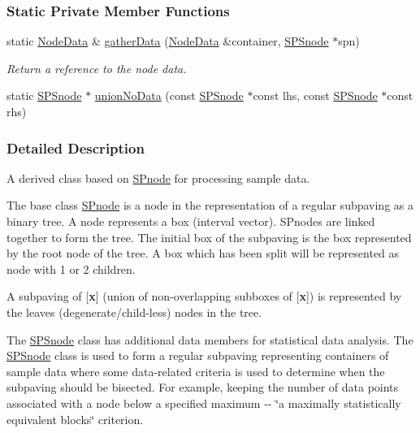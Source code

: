 \subsubsection*{\-Static \-Private \-Member \-Functions}
\begin{DoxyCompactItemize}
\item 
static \hyperlink{namespacesubpavings_af005697b49cff9ea37fc3bc9ed19da30}{\-Node\-Data} \& \hyperlink{classsubpavings_1_1SPSnode_ac16a08aea6f8316526c46382e3252959}{gather\-Data} (\hyperlink{namespacesubpavings_af005697b49cff9ea37fc3bc9ed19da30}{\-Node\-Data} \&container, \hyperlink{classsubpavings_1_1SPSnode}{\-S\-P\-Snode} $\ast$spn)
\begin{DoxyCompactList}\small\item\em \-Return a reference to the node data. \end{DoxyCompactList}\item 
static \hyperlink{classsubpavings_1_1SPSnode}{\-S\-P\-Snode} $\ast$ \hyperlink{classsubpavings_1_1SPSnode_a6c28eccf9962c4b9010f2f04b0231d30}{union\-No\-Data} (const \hyperlink{classsubpavings_1_1SPSnode}{\-S\-P\-Snode} $\ast$const lhs, const \hyperlink{classsubpavings_1_1SPSnode}{\-S\-P\-Snode} $\ast$const rhs)
\end{DoxyCompactItemize}


\subsubsection{\-Detailed \-Description}
\-A derived class based on \hyperlink{classsubpavings_1_1SPnode}{\-S\-Pnode} for processing sample data. 

\-The base class \hyperlink{classsubpavings_1_1SPnode}{\-S\-Pnode} is a node in the representation of a regular subpaving as a binary tree. \-A node represents a box (interval vector). \-S\-Pnodes are linked together to form the tree. \-The initial box of the subpaving is the box represented by the root node of the tree. \-A box which has been split will be represented as node with 1 or 2 children.

\-A subpaving of \mbox{[}{\bfseries x}\mbox{]} (union of non-\/overlapping subboxes of \mbox{[}{\bfseries x}\mbox{]}) is represented by the leaves (degenerate/child-\/less) nodes in the tree.

\-The \hyperlink{classsubpavings_1_1SPSnode}{\-S\-P\-Snode} class has additional data members for statistical data analysis. \-The \hyperlink{classsubpavings_1_1SPSnode}{\-S\-P\-Snode} class is used to form a regular subpaving representing containers of sample data where some data-\/related criteria is used to determine when the subpaving should be bisected. \-For example, keeping the number of data points associated with a node below a specified maximum -\/-\/ \char`\"{}a maximally statistically equivalent
    blocks\char`\"{} criterion.


